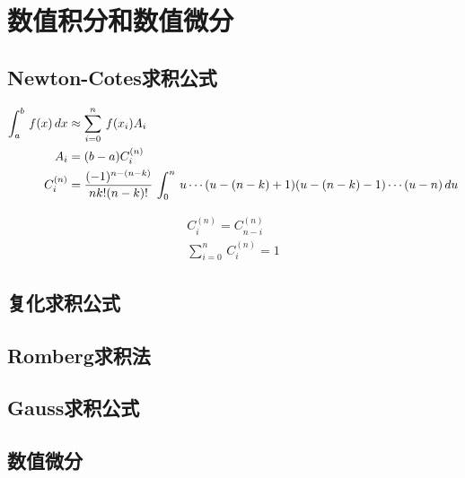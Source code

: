 \chapter{数值积分和数值微分}

\section{Newton-Cotes求积公式}

\begin{subequations}
\begin{align}
\int_a^b\,f(x)\,dx &\approx \sum_{i=0}^n\,f(x_i)A_i\\
A_i &= (b-a)C^{(n)}_i\\
C_i^{(n)} &= {(-1)^{n - (n-k)}\over{nk!(n-k)!}}\,\int_0^n\,u\cdots(u-(n-k)+1)(u-(n-k)-1)\cdots(u-n)\,du
\end{align}
\end{subequations}

\begin{subequations}
\begin{align}
C^{(n)}_i = C^{(n)}_{n - i}\\
\sum_{i=0}^n\,C^{(n)}_i = 1
\end{align}
\end{subequations}

\section{复化求积公式}


\section{Romberg求积法}

\section{Gauss求积公式}

\section{数值微分}
